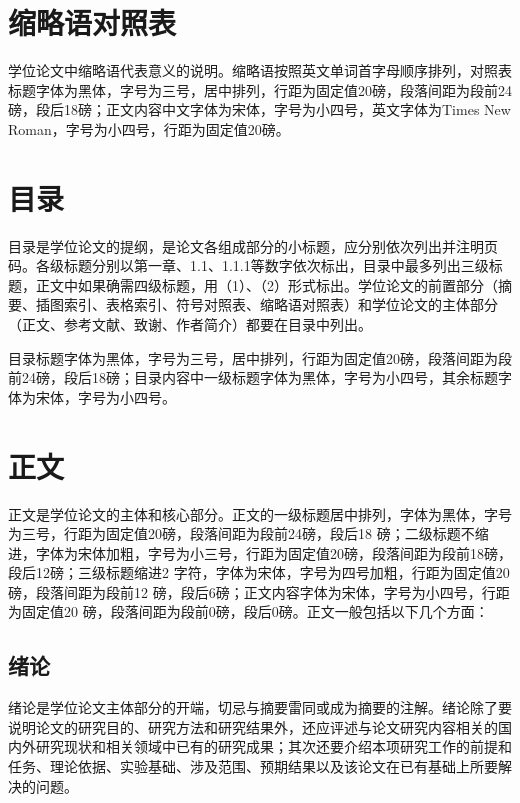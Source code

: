 \section{缩略语对照表}
学位论文中缩略语代表意义的说明。缩略语按照英文单词首字母顺序排列，对照表标题字体为黑体，字号为三号，居中排列，行距为固定值20磅，段落间距为段前24磅，段后18磅；正文内容中文字体为宋体，字号为小四号，英文字体为Times New Roman，字号为小四号，行距为固定值20磅。
\section{目录}
目录是学位论文的提纲，是论文各组成部分的小标题，应分别依次列出并注明页码。各级标题分别以第一章、1.1、1.1.1等数字依次标出，目录中最多列出三级标题，正文中如果确需四级标题，用（1）、（2）形式标出。学位论文的前置部分（摘要、插图索引、表格索引、符号对照表、缩略语对照表）和学位论文的主体部分（正文、参考文献、致谢、作者简介）都要在目录中列出。
\par
目录标题字体为黑体，字号为三号，居中排列，行距为固定值20磅，段落间距为段前24磅，段后18磅；目录内容中一级标题字体为黑体，字号为小四号，其余标题字体为宋体，字号为小四号。
\section{正文}
正文是学位论文的主体和核心部分。正文的一级标题居中排列，字体为黑体，字号为三号，行距为固定值20磅，段落间距为段前24磅，段后18 磅；二级标题不缩进，字体为宋体加粗，字号为小三号，行距为固定值20磅，段落间距为段前18磅，段后12磅；三级标题缩进2 字符，字体为宋体，字号为四号加粗，行距为固定值20磅，段落间距为段前12 磅，段后6磅；正文内容字体为宋体，字号为小四号，行距为固定值20 磅，段落间距为段前0磅，段后0磅。正文一般包括以下几个方面：
\subsection{绪论}
绪论是学位论文主体部分的开端，切忌与摘要雷同或成为摘要的注解。绪论除了要说明论文的研究目的、研究方法和研究结果外，还应评述与论文研究内容相关的国内外研究现状和相关领域中已有的研究成果；其次还要介绍本项研究工作的前提和任务、理论依据、实验基础、涉及范围、预期结果以及该论文在已有基础上所要解决的问题。

